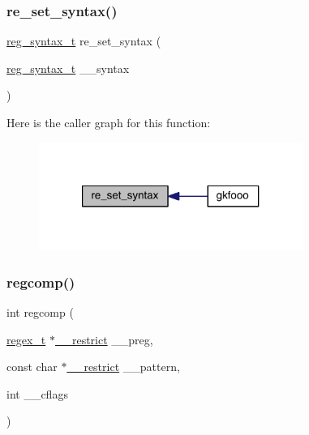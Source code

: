 \subsubsection{\texorpdfstring{re\+\_\+set\+\_\+syntax()}{re\_set\_syntax()}}
{\footnotesize\ttfamily \hyperlink{a00092_a7e0565199a2fabaca3d67a5a44fc4229}{reg\+\_\+syntax\+\_\+t} re\+\_\+set\+\_\+syntax (\begin{DoxyParamCaption}\item[{\hyperlink{a00092_a7e0565199a2fabaca3d67a5a44fc4229}{reg\+\_\+syntax\+\_\+t}}]{\+\_\+\+\_\+syntax }\end{DoxyParamCaption})}

Here is the caller graph for this function\+:\nopagebreak
\begin{figure}[H]
\begin{center}
\leavevmode
\includegraphics[width=244pt]{a00092_ad71c2bb1368325a350179abb1b0e6210_icgraph}
\end{center}
\end{figure}
\mbox{\label{a00092_a430f0c9389ac6c08be2286257691317b}} 
\subsubsection{\texorpdfstring{regcomp()}{regcomp()}}
{\footnotesize\ttfamily int regcomp (\begin{DoxyParamCaption}\item[{\hyperlink{a00092_a159f97bcead74ee31a0817571f7625a9}{regex\+\_\+t} $\ast$\hyperlink{a00092_a4127c12268159bf73f8e69b23c34c610}{\+\_\+\+\_\+restrict}}]{\+\_\+\+\_\+preg,  }\item[{const char $\ast$\hyperlink{a00092_a4127c12268159bf73f8e69b23c34c610}{\+\_\+\+\_\+restrict}}]{\+\_\+\+\_\+pattern,  }\item[{int}]{\+\_\+\+\_\+cflags }\end{DoxyParamCaption})}

